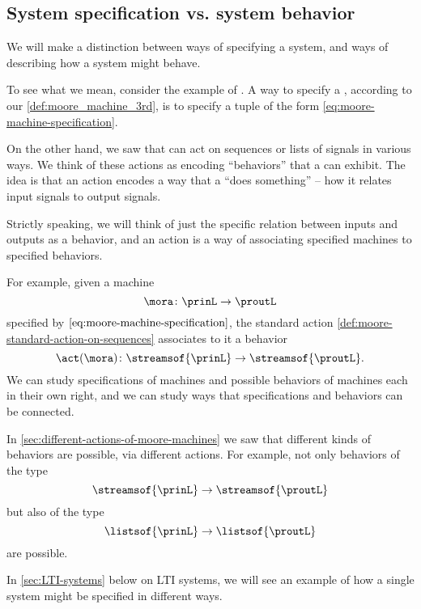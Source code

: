 
\subsection{System specification vs. system behavior}

We will make a distinction between ways of specifying a system, and ways of describing how a system might behave.

To see what we mean, consider the example of .
A way to specify a , according to our \cref{def:moore_machine_3rd}, is to specify a tuple of the form \cref{eq:moore-machine-specification}.

On the other hand, we saw that  can act on sequences or lists of signals in various ways.
We think of these actions as encoding ``behaviors'' that a  can exhibit.
The idea is that an action encodes a way that a  ``does something'' -- how it relates input signals to output signals.

Strictly speaking, we will think of just the specific relation between inputs and outputs as a behavior, and an action is a way of associating specified machines to specified behaviors.


For example, given a machine
\begin{equation}
    \mora \colon \prinL \to \proutL
\end{equation}
specified by $\cref{eq:moore-machine-specification}$, the standard action \cref{def:moore-standard-action-on-sequences} associates to it a behavior
\begin{equation}
    \act(\mora) \colon \streamsof{\prinL} \to \streamsof{\proutL}.
\end{equation}
We can study specifications of machines and possible behaviors of machines each in their own right, and we can study ways that specifications and behaviors can be connected.

In \cref{sec:different-actions-of-moore-machines} we saw that different kinds of behaviors are possible, via different actions.
For example, not only behaviors of the type
\begin{equation}
    \streamsof{\prinL}  \to \streamsof{\proutL}
\end{equation}
but also of the type
\begin{equation}
    \listsof{\prinL} \to \listsof{\proutL}
\end{equation}
are possible.

In \cref{sec:LTI-systems} below on LTI systems, we will see an example of how a single system might be specified in different ways.


